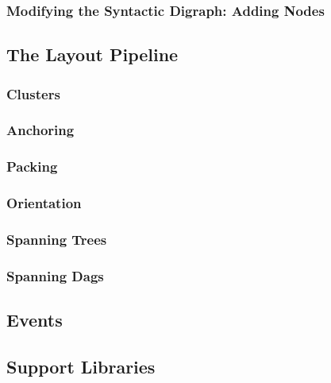 \subsubsection{Modifying the Syntactic Digraph: Adding Nodes}



\subsection{The Layout Pipeline}

\label{section-gd-layout-pipeline}

\subsubsection{Clusters}

\subsubsection{Anchoring}

\subsubsection{Packing}

\subsubsection{Orientation}

\subsubsection{Spanning Trees}

\subsubsection{Spanning Dags}


\subsection{Events}

\label{section-gd-events}



\subsection{Support Libraries}

\label{section-gd-libs}

